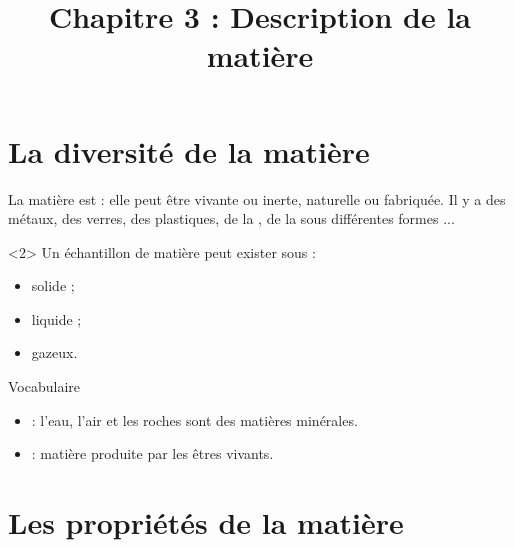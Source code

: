 \documentclass[xcolor={dvipsnames}]{beamer}
\title{Chapitre 3 : Description de la matière}
\begin{document}
\begin{frame}
  \titlepage 
\end{frame}


\section{La diversité de la matière}

\begin{frame}




\begin{alertblock}{}
	La matière est  : elle peut être vivante ou inerte, naturelle ou fabriquée. Il y a des métaux, des verres, des plastiques, de la , de la  sous différentes formes ...
\end{alertblock}


\begin{alertblock}<2>{}
	Un échantillon de matière peut exister sous  :
	\begin{itemize}
		\item solide ;
		\item liquide ;
		\item gazeux.
	\end{itemize}
\end{alertblock}

\end{frame}


\begin{frame}

\begin{block}{\Large{Vocabulaire}}
	\begin{itemize}
		\item {} : \pause  l'eau, l'air et les roches sont des matières minérales.\pause
		
		\item {} : \pause matière produite par les êtres vivants.
	\end{itemize}
\end{block}
		
\end{frame}

\section{Les propriétés de la matière}
\end{document}
